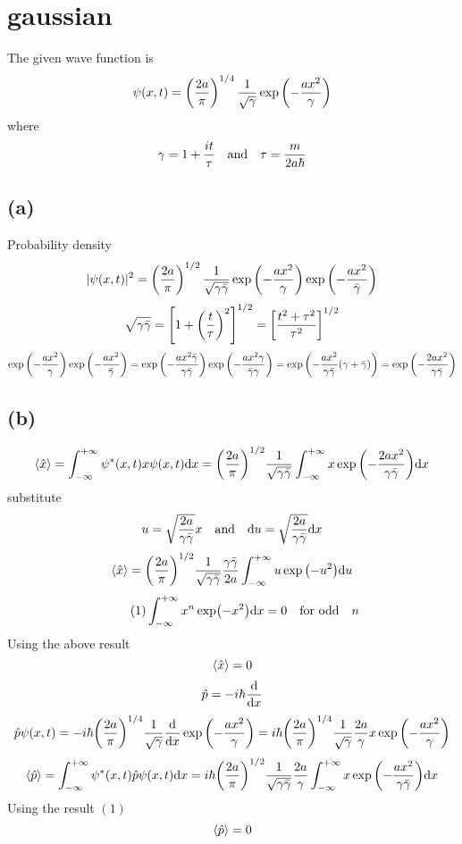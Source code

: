 \section*{gaussian}
The given wave function is 
\[\psi(x,t)=\left(\frac{2a}{\pi}\right)^{1/4}\frac{1}{\sqrt{\gamma}}\exp\qty(-\frac{ax^2}{\gamma})\]
where
\[\gamma=1+\frac{it}{\tau}\qq{and}\tau=\frac{m}{2a\hbar}\]
\subsection*{(a)}
Probability density
\[|\psi(x,t)|^2=\left(\frac{2a}{\pi}\right)^{1/2}\frac{1}{\sqrt{\gamma\bar{\gamma}}}\exp\qty(-\frac{ax^2}{\gamma})\exp\qty(-\frac{ax^2}{\bar{\gamma}})\]
\[\sqrt{\gamma\bar{\gamma}}=\qty[1+\qty(\frac{t}{\tau})^2]^{1/2}=\qty[\frac{t^2+\tau^2}{\tau^2}]^{1/2}\]
\[\exp\qty(-\frac{ax^2}{\gamma})\exp\qty(-\frac{ax^2}{\bar{\gamma}})=\exp\qty(-\frac{ax^2\bar{\gamma}}{\gamma\bar{\gamma}})\exp\qty(-\frac{ax^2\gamma}{\bar{\gamma}\gamma})=\exp\qty(-\frac{ax^2}{\gamma\bar{\gamma}}(\gamma+\bar{\gamma}))=\exp\qty(-\frac{2ax^2}{\gamma\bar{\gamma}})\]
\subsection*{(b)}
\[\expval{\hat{x}}=\int_{-\infty}^{+\infty}\psi^*(x,t)x\psi(x,t)\dd x=\qty(\frac{2a}{\pi})^{1/2}\frac{1}{\sqrt{\gamma\bar{\gamma}}}\int_{-\infty}^{+\infty}x\exp\qty(-\frac{2ax^2}{\gamma\bar{\gamma}})\dd x\]
substitute \[u=\sqrt{\frac{2a}{\gamma\bar{\gamma}}}x\qq{and}\dd u=\sqrt{\frac{2a}{\gamma\bar{\gamma}}}\dd x\]
\[\ev{\hat{x}}=\qty(\frac{2a}{\pi})^{1/2}\frac{1}{\sqrt{\gamma\bar{\gamma}}}\frac{\gamma\bar{\gamma}}{2a}\int_{-\infty}^{+\infty}u\exp\qty(-u^2)\dd u\]
\[\tag{1}\int_{-\infty}^{+\infty}x^n\exp(-x^2)\dd x=0\qq{for odd}n\]
Using the above result \[\ev{\hat{x}}=0\]
\[\hat{p}=-i\hbar\dv{x}\]
\[\hat{p}\psi(x,t)=-i\hbar\qty(\frac{2a}{\pi})^{1/4}\frac{1}{\sqrt{\gamma}}\dv{x}\exp\qty(-\frac{ax^2}{\gamma})=i\hbar\qty(\frac{2a}{\pi})^{1/4}\frac{1}{\sqrt{\gamma}}\frac{2a}{\gamma}	 x\exp\qty(-\frac{ax^2}{\gamma})\]
\[\ev{\hat{p}}=\int_{-\infty}^{+\infty}\psi^*(x,t)\hat{p}\psi(x,t)\dd x=i\hbar\qty(\frac{2a}{\pi})^{1/2}\frac{1}{\sqrt{\gamma\bar{\gamma}}}\frac{2a}{\gamma}	 \int_{-\infty}^{+\infty}x\exp\qty(-\frac{ax^2}{\gamma\bar{\gamma}})\dd x\]
Using the result $(1)$
\[\ev{\hat{p}}=0\]
